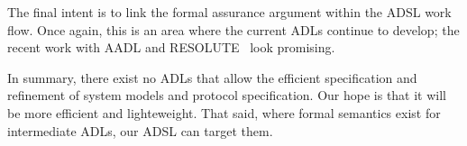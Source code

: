 The final intent is to link the formal assurance argument within the ADSL work
flow. Once again, this is an area where the current ADLs continue to develop;
the recent work with AADL and RESOLUTE~\cite{gacek2014resolute} look
promising.

In summary, there exist no ADLs that allow the efficient
specification and refinement of system models and protocol specification. Our
hope is that it will be more efficient and lighteweight. That said, where formal
semantics exist for intermediate ADLs, our ADSL can target them.









